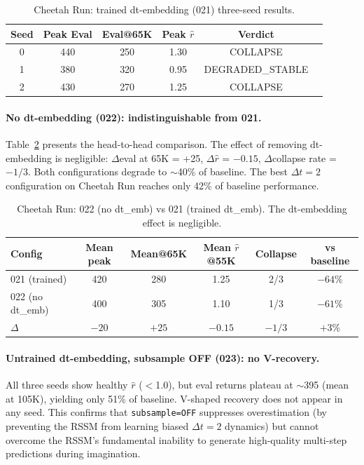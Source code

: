 \documentclass[10pt,letterpaper]{article}
\newcommand{\dt}{\Delta t}
\begin{document}
\begin{table}[t]
\centering
\caption{Cheetah Run: trained dt-embedding (021) three-seed results.}
\label{tab:cheetah_021}
\small
\begin{tabular}{cccccl}
\toprule
Seed & Peak Eval & Eval@65K & Peak $\hat{r}$ & Verdict \\
\midrule
0 & 440 & 250 & 1.30 & COLLAPSE \\
1 & 380 & 320 & 0.95 & DEGRADED\_STABLE \\
2 & 430 & 270 & 1.25 & COLLAPSE \\
\bottomrule
\end{tabular}
\end{table}

\paragraph{No dt-embedding (022): indistinguishable from 021.}
Table~\ref{tab:cheetah_022v021} presents the head-to-head comparison.
The effect of removing dt-embedding is negligible: $\Delta$eval at 65K = +25, $\Delta\hat{r}$ = $-0.15$, $\Delta$collapse rate = $-1/3$.
Both configurations degrade to $\sim$40\% of baseline.
The best $\dt=2$ configuration on Cheetah Run reaches only 42\% of baseline performance.

\begin{table}[t]
\centering
\caption{Cheetah Run: 022 (no dt\_emb) vs 021 (trained dt\_emb). The dt-embedding effect is negligible.}
\label{tab:cheetah_022v021}
\small
\begin{tabular}{lccccc}
\toprule
Config & Mean peak & Mean@65K & Mean $\hat{r}$@55K & Collapse & vs baseline \\
\midrule
021 (trained) & 420 & 280 & 1.25 & 2/3 & $-64$\% \\
022 (no dt\_emb) & 400 & 305 & 1.10 & 1/3 & $-61$\% \\
$\Delta$ & $-20$ & $+25$ & $-0.15$ & $-1/3$ & $+3$\% \\
\bottomrule
\end{tabular}
\end{table}

\paragraph{Untrained dt-embedding, subsample OFF (023): no V-recovery.}
All three seeds show healthy $\hat{r}$ ($<$1.0), but eval returns plateau at $\sim$395 (mean at 105K), yielding only 51\% of baseline.
V-shaped recovery does not appear in any seed.
This confirms that \texttt{subsample=OFF} suppresses overestimation (by preventing the RSSM from learning biased $\dt=2$ dynamics) but cannot overcome the RSSM's fundamental inability to generate high-quality multi-step predictions during imagination.
\end{document}
